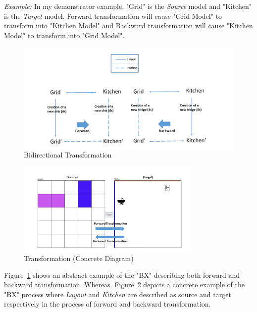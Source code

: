 \textit{Example:} In my demonstrator example, "Grid" is the \textit{Source} model and "Kitchen" is the \textit{Target} model. Forward transformation will cause "Grid Model" to transform into "Kitchen Model" and Backward transformation will cause "Kitchen Model" to transform into "Grid Model".

\begin{figure}
	\centering
	\includegraphics[width=1\textwidth]{figures/BX}
	\caption{Bidirectional Transformation}
	\label{fig:BX_Diagram}
\end{figure}

\begin{figure}
	\centering
	\includegraphics[width=0.8\textwidth]{figures/Transformation_Concrete}
	\caption{Transformation (Concrete Diagram)}
	\label{fig:Transformation_Concrete}
\end{figure}

Figure~\ref{fig:BX_Diagram} shows an abstract example of the "BX" describing both forward and backward transformation. Whereas, Figure~\ref{fig:Transformation_Concrete} depicts a concrete example of the "BX" process where \textit{Layout} and \textit{Kitchen} are described as source and target respectively in the process of forward and backward transformation.